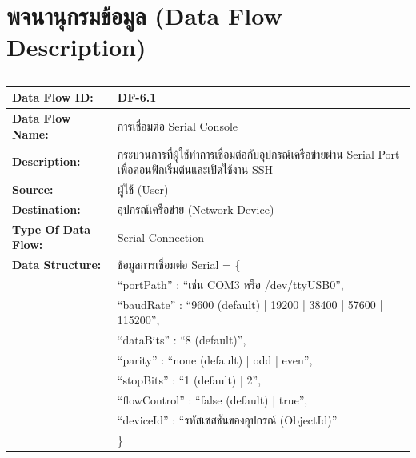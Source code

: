 \section{พจนานุกรมข้อมูล (Data Flow Description)}


\begin{table}[H]
    \caption{}
    \label{tab:df-6-1}
    \fontSixTeen 
    \begin{tabularx}{\textwidth}{|l|L|} 
        \hline
        \textbf{Data Flow ID:} & DF-6.1 \\
        \hline
        \textbf{Data Flow Name:} & การเชื่อมต่อ Serial Console \\
        \hline
        \textbf{Description:} & กระบวนการที่ผู้ใช้ทำการเชื่อมต่อกับอุปกรณ์เครือข่ายผ่าน Serial Port เพื่อคอนฟิกเริ่มต้นและเปิดใช้งาน SSH \\
        \hline
        \textbf{Source:} & ผู้ใช้ (User) \\
        \hline
        \textbf{Destination:} & อุปกรณ์เครือข่าย (Network Device) \\
        \hline
        \textbf{Type Of Data Flow:} & Serial Connection \\
        \hline
        \textbf{Data Structure:} & ข้อมูลการเชื่อมต่อ Serial = \{ \nonumber \\
                        & \hspace{1em} ``portPath'' : ``เช่น COM3 หรือ /dev/ttyUSB0'', \nonumber \\
                        & \hspace{1em} ``baudRate'' : ``9600 (default) | 19200 | 38400 | 57600 | 115200'', \nonumber \\
                        & \hspace{1em} ``dataBits'' : ``8 (default)'', \nonumber \\
                        & \hspace{1em} ``parity'' : ``none (default) | odd | even'', \nonumber \\
                        & \hspace{1em} ``stopBits'' : ``1 (default) | 2'', \nonumber \\
                        & \hspace{1em} ``flowControl'' : ``false (default) | true'', \nonumber \\
                        & \hspace{1em} ``deviceId'' : ``รหัสเซสชันของอุปกรณ์ (ObjectId)'' \nonumber \\
                        & \} \\
        \hline
    \end{tabularx}
\end{table}

